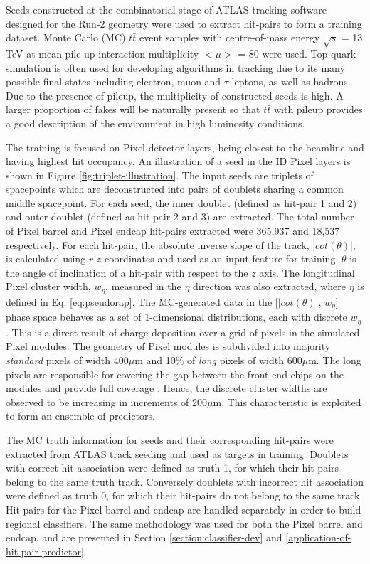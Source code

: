 Seeds constructed at the combinatorial stage of ATLAS tracking software designed for the Run-2 geometry were used to extract hit-pairs to form a training dataset. Monte Carlo (MC) $t\bar{t}$ event samples with centre-of-mass energy $\sqrt{s}$ = 13 TeV at mean pile-up interaction multiplicity $< \mu >$ = 80 were used. Top quark simulation is often used for developing algorithms in tracking due to its many possible final states including electron, muon and $\tau$ leptons, as well as hadrons. Due to the presence of pileup, the multiplicity of constructed seeds is high. A larger proportion of fakes will be naturally present so that $t\bar{t}$ with pileup provides a good description of the environment in high luminosity conditions.

The training is focused on Pixel detector layers, being closest to the beamline and having highest hit occupancy. An illustration of a seed in the ID Pixel layers is shown in Figure \ref{fig:triplet-illustration}. The input seeds are triplets of spacepoints which are deconstructed into pairs of doublets sharing a common middle spacepoint. For each seed, the inner doublet (defined as hit-pair 1 and 2) and outer doublet (defined as hit-pair 2 and 3) are extracted. The total number of Pixel barrel and Pixel endcap hit-pairs extracted were 365,937 and 18,537 respectively. For each hit-pair, the absolute inverse slope of the track, $|cot(\theta)|$, is calculated using $r$-$z$ coordinates and used as an input feature for training. $\theta$ is the angle of inclination of a hit-pair with respect to the $z$ axis. The longitudinal Pixel cluster width, $w_{\eta}$, measured in the $\eta$ direction was also extracted, where $\eta$ is defined in Eq. \ref{eq:pseudorap}. The MC-generated data in the [$|cot(\theta)|$, $w_{\eta}$] phase space behaves as a set of 1-dimensional distributions, each with discrete $w_{\eta}$. This is a direct result of charge deposition over a grid of pixels in the simulated Pixel modules. The geometry of Pixel modules is subdivided into majority \textit{standard} pixels of width 400$\mu$m and 10\% of \textit{long} pixels of width 600$\mu$m. The long pixels are responsible for covering the gap between the front-end chips on the modules and provide full coverage \cite{pixel-module-dimensions}. Hence, the discrete cluster widths are observed to be increasing in increments of 200$\mu$m. This characteristic is exploited to form an ensemble of predictors. 

The MC truth information for seeds and their corresponding hit-pairs were extracted from ATLAS track seeding and used as targets in training. Doublets with correct hit association were defined as truth 1, for which their hit-pairs belong to the same truth track. Conversely doublets with incorrect hit association were defined as truth 0, for which their hit-pairs do not belong to the same track. Hit-pairs for the Pixel barrel and endcap are handled separately in order to build regional classifiers. The same methodology was used for both the Pixel barrel and endcap, and are presented in Section \ref{section:classifier-dev} and \ref{application-of-hit-pair-predictor}.


